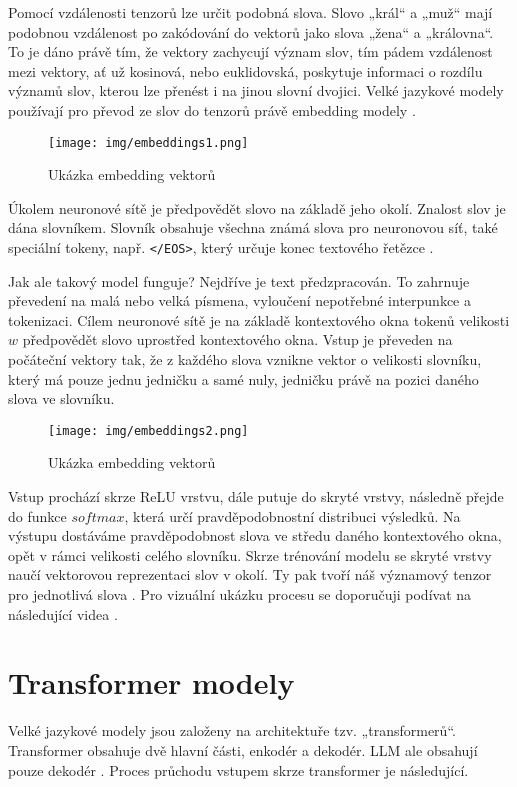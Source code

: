 \documentclass[FM,DP]{tulthesis}
\begin{document}
		Pomocí vzdálenosti tenzorů lze určit podobná slova. Slovo „král“ a „muž“ mají podobnou vzdálenost po zakódování do vektorů jako slova „žena“ a „královna“. To je dáno právě tím, že vektory zachycují význam slov, tím pádem vzdálenost mezi vektory, ať už kosinová, nebo euklidovská, poskytuje informaci o rozdílu významů slov, kterou lze přenést i na jinou slovní dvojici. Velké jazykové modely používají pro převod ze slov do tenzorů právě embedding modely \cite{embeddings} \cite{embeddings2}.
		
		\begin{figure}[H]
			\centering
			\texttt{[image: img/embeddings1.png]}
			\caption{Ukázka embedding vektorů \cite{embeddings_img1}}
			\label{fig:e1}
		\end{figure}
		
		Úkolem neuronové sítě je předpovědět slovo na základě jeho okolí. Znalost slov je dána slovníkem. Slovník obsahuje všechna známá slova pro neuronovou síť, také speciální tokeny, např. \verb|</EOS>|, který určuje konec textového řetězce \cite{embeddings2}. 
		
		Jak ale takový model funguje? Nejdříve je text předzpracován. To zahrnuje převedení na malá nebo velká písmena, vyloučení nepotřebné interpunkce a tokenizaci. Cílem neuronové sítě je na základě kontextového okna tokenů velikosti $w$ předpovědět slovo uprostřed kontextového okna. Vstup je převeden na počáteční vektory tak, že z každého slova vznikne vektor o velikosti slovníku, který má pouze jednu jedničku a samé nuly, jedničku právě na pozici daného slova ve slovníku.
		
		\begin{figure}[H]
			\centering
			\texttt{[image: img/embeddings2.png]}
			\caption{Ukázka embedding vektorů \cite{embeddings_img2}}
			\label{fig:e2}
		\end{figure}
		
		Vstup prochází skrze ReLU vrstvu, dále putuje do skryté vrstvy, následně přejde do funkce $softmax$, která určí pravděpodobnostní distribuci výsledků. Na výstupu dostáváme pravděpodobnost slova ve středu daného kontextového okna, opět v rámci velikosti celého slovníku. Skrze trénování modelu se skryté vrstvy naučí vektorovou reprezentaci slov v okolí. Ty pak tvoří náš významový tenzor pro jednotlivá slova \cite{paper:word2vec} \cite{tokenization}. Pro vizuální ukázku procesu se doporučuji podívat na následující videa \cite{ytb:embeddings} \cite{ytb:word2vec}.
		
		\section{Transformer modely} \label{transformers}
		Velké jazykové modely jsou založeny na architektuře tzv. „transformerů“. Transformer obsahuje dvě hlavní části, enkodér a dekodér. LLM ale obsahují pouze dekodér \cite{rothman2021transformers}. Proces průchodu vstupem skrze transformer je následující.
		
\end{document}
